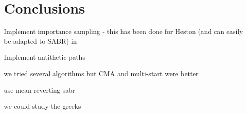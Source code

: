 
\chapter{Conclusions}
\label{chapter:conclusions}
Implement importance sampling - this has been done for Heston (and can easily be adapted to SABR) in \cite{Stilger}

Implement antithetic paths

we tried several algorithms but CMA and multi-start were better


use mean-reverting sabr

we could study the greeks